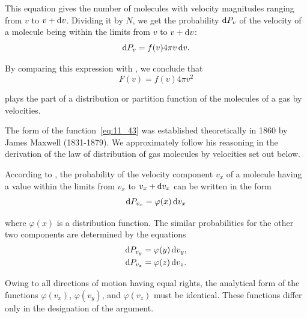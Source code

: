 \noindent
This equation gives the number of molecules with velocity magnitudes ranging from $v$ to $v+\mathrm{d} v$. Dividing it by $N$, we get the probability $\mathrm{d} P_v$ of the velocity of a molecule being within the limits from $v$ to $v+\mathrm{d} v$:
\begin{equation}\label{eq:11_42}
	\mathrm{d} P_v = f(v) 4\pi v\,\mathrm{d} v.
\end{equation}

\noindent
By comparing this expression with , we conclude that
\begin{equation}\label{eq:11_43}
	F(v) = f(v) 4\pi v^2
\end{equation}

\noindent
plays the part of a distribution or partition function of the molecules of a gas by velocities.

The form of the function~\eqref{eq:11_43} was established theoretically in 1860 by James Maxwell (1831-1879). We approximately follow his reasoning in the derivation of the law of distribution of gas molecules by velocities set out below.

According to , the probability of the velocity component $v_x$ of a molecule having a value within the limits from $v_x$ to $v_x+\mathrm{d} v_x$ can be written in the form
\begin{equation}\label{eq:11_44}
	\mathrm{d} P_{v_x} = \varphi(x)\,\mathrm{d} v_x
\end{equation}

\noindent
where $\varphi(x)$ is a distribution function. The similar probabilities for the other two components are determined by the equations
\begin{align}
	\mathrm{d} P_{v_y} &= \varphi(y)\,\mathrm{d} v_y, \label{eq:11_45}\\
	\mathrm{d} P_{v_z} &= \varphi(z)\,\mathrm{d} v_z. \label{eq:11_46}
\end{align}

\noindent
Owing to all directions of motion having equal rights, the analytical form of the functions $\varphi(v_x)$, $\varphi(v_y)$, and $\varphi(v_z)$ must be identical. These functions differ only in the designation of the argument.

